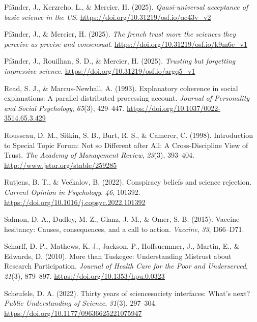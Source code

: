 \documentclass[
  jou,
  floatsintext,
  longtable,
  nolmodern,
  notxfonts,
  notimes,
  colorlinks=true,linkcolor=blue,citecolor=blue,urlcolor=blue]{apa7}
\newlength{\cslhangindent}
\newenvironment{CSLReferences}[2] %
 {\begin{list}{}{%
  \setlength{\itemindent}{0pt}
  \setlength{\leftmargin}{0pt}
  \setlength{\parsep}{0pt}
  \ifodd #1
   \setlength{\leftmargin}{\cslhangindent}
   \setlength{\itemindent}{-1\cslhangindent}
  \fi
  \setlength{\itemsep}{#2\baselineskip}}}
 {\end{list}}
\begin{document}
\begin{CSLReferences}{1}{0}
Pfänder, J., Kerzreho, L., \& Mercier, H. (2025). \emph{Quasi-universal
acceptance of basic science in the US}.
\url{https://doi.org/10.31219/osf.io/qc43v_v2}

Pfänder, J., \& Mercier, H. (2025). \emph{The french trust more the
sciences they perceive as precise and consensual}.
\url{https://doi.org/10.31219/osf.io/k9m6e_v1}

Pfänder, J., Rouilhan, S. D., \& Mercier, H. (2025). \emph{Trusting but
forgetting impressive science}.
\url{https://doi.org/10.31219/osf.io/argq5_v1}

Read, S. J., \& Marcus-Newhall, A. (1993). Explanatory coherence in
social explanations: A parallel distributed processing account.
\emph{Journal of Personality and Social Psychology}, \emph{65}(3),
429--447. \url{https://doi.org/10.1037/0022-3514.65.3.429}

Rousseau, D. M., Sitkin, S. B., Burt, R. S., \& Camerer, C. (1998).
Introduction to Special Topic Forum: Not so Different after All: A
Cross-Discipline View of Trust. \emph{The Academy of Management Review},
\emph{23}(3), 393--404. \url{http://www.jstor.org/stable/259285}

Rutjens, B. T., \& Većkalov, B. (2022). Conspiracy beliefs and science
rejection. \emph{Current Opinion in Psychology}, \emph{46}, 101392.
\url{https://doi.org/10.1016/j.copsyc.2022.101392}

Salmon, D. A., Dudley, M. Z., Glanz, J. M., \& Omer, S. B. (2015).
Vaccine hesitancy: Causes, consequences, and a call to action.
\emph{Vaccine}, \emph{33}, D66--D71.

Scharff, D. P., Mathews, K. J., Jackson, P., Hoffsuemmer, J., Martin,
E., \& Edwards, D. (2010). More than Tuskegee: Understanding Mistrust
about Research Participation. \emph{Journal of Health Care for the Poor
and Underserved}, \emph{21}(3), 879--897.
\url{https://doi.org/10.1353/hpu.0.0323}

Scheufele, D. A. (2022). Thirty years of science{\textendash}society
interfaces: What{'}s next? \emph{Public Understanding of Science},
\emph{31}(3), 297--304. \url{https://doi.org/10.1177/09636625221075947}


\end{CSLReferences}
\end{document}
